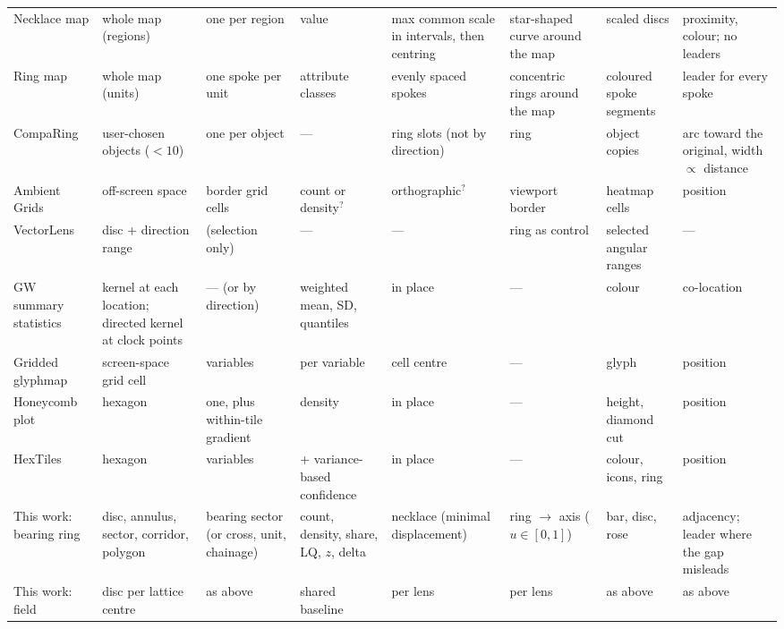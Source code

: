 \begin{table}[t]
\begin{tabularx}{\textwidth}{@{}>{\raggedright}p{2.55cm}
      >{\raggedright}X >{\raggedright}X >{\raggedright}p{1.35cm}
      >{\raggedright}X >{\raggedright}X >{\raggedright}X >{\raggedright\arraybackslash}X@{}}
    Necklace map \cite{speckmann2010necklace} & whole map (regions) & one per region & value & max common scale in intervals, then centring & star-shaped curve around the map & scaled discs & proximity, colour; no leaders \\
    Ring map \cite{stewart2011ringmaps} & whole map (units) & one spoke per unit & attribute classes & evenly spaced spokes & concentric rings around the map & coloured spoke segments & leader for every spoke \\
    CompaRing \cite{tominski2016comparing} & user-chosen objects ($<10$) & one per object & --- & ring slots (not by direction) & ring & object copies & arc toward the original, width $\propto$ distance \\
    Ambient Grids \cite{jackle2015ambient,jackle2017topology} & off-screen space & border grid cells & count or density$^{?}$ & orthographic$^{?}$ & viewport border & heatmap cells & position \\
    VectorLens \cite{dumas2015vectorlens} & disc + direction range & (selection only) & --- & --- & ring as control & selected angular ranges & --- \\
    GW summary statistics \cite{brunsdon2002gwss,dykes2007gwvis} & kernel at each location; directed kernel at clock points & --- (or by direction) & weighted mean, SD, quantiles & in place & --- & colour & co-location \\
    Gridded glyphmap \cite{slingsby2023gridded,laksono2024gridded} & screen-space grid cell & variables & per variable & cell centre & --- & glyph & position \\
    Honeycomb plot \cite{trautner2022honeycomb} & hexagon & one, plus within-tile gradient & density & in place & --- & height, diamond cut & position \\
    HexTiles \cite{kawakami2024hextiles} & hexagon & variables & + variance-based confidence & in place & --- & colour, icons, ring & position \\
    \midrule
    This work: bearing ring & disc, annulus, sector, corridor, polygon & bearing sector (or cross, unit, chainage) & count, density, share, LQ, $z$, delta & necklace (minimal displacement) & ring $\to$ axis ($u\in[0,1]$) & bar, disc, rose & adjacency; leader where the gap misleads \\
    This work: field & disc per lattice centre & as above & shared baseline & per lens & per lens & as above & as above \\
    \bottomrule
  \end{tabularx}
\end{table}
